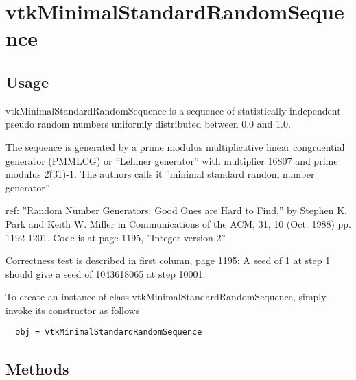 \section{vtkMinimalStandardRandomSequence}

\subsection{Usage}

 vtkMinimalStandardRandomSequence is a sequence of statistically independent
 pseudo random numbers uniformly distributed  between 0.0 and 1.0.

 The sequence is generated by a prime modulus multiplicative linear
 congruential generator (PMMLCG) or ''Lehmer generator'' with multiplier 16807
 and prime modulus 2\^(31)-1. The authors calls it
 ''minimal standard random number generator''

 ref: ''Random Number Generators: Good Ones are Hard to Find,''
 by Stephen K. Park and Keith W. Miller in Communications of the ACM,
 31, 10 (Oct. 1988) pp. 1192-1201.
 Code is at page 1195, ''Integer version 2''

 Correctness test is described in first column, page 1195:
 A seed of 1 at step 1 should give a seed of 1043618065 at step 10001.

To create an instance of class vtkMinimalStandardRandomSequence, simply
invoke its constructor as follows
\begin{verbatim}
  obj = vtkMinimalStandardRandomSequence
\end{verbatim}
\subsection{Methods}

